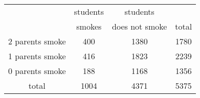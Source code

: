 \documentclass[a4paper,11pt]{article}
\begin{document}
 
\begin{table}[htbp]
\begin{center}
\begin{tabular}{c|cc|c}
\multirow{2}{1.5cm}{}&students&students&\\ 
&smokes & does not smoke &total\\ \hline
2 parents smoke & 400 & 1380 & 1780 \\
1 parents smoke & 416 & 1823 & 2239 \\
0 parents smoke & 188 & 1168 & 1356 \\ \hline
total & 1004 & 4371 & 5375 \\
\end{tabular}
\end{center}
\end{table}
 
\end{document}
